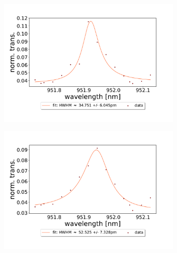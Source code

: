 \begin{figure}[h!]
\begin{subfigure}[b]{0.49\textwidth}
        \includegraphics[width=\textwidth]{figures/results/double fano fits/20250326/53um_M3:M5_fit_5.pdf}
        \caption{}
        \label{fig:53um_M3:M5_fit_5}
    \end{subfigure}
    \begin{subfigure}[b]{0.49\textwidth}
        \includegraphics[width=\textwidth]{figures/results/double fano fits/20250326/53um_M3:M5_fit_6.pdf}
        \caption{}
        \label{fig:53um_M3:M5_fit_6}
    \end{subfigure}
\end{figure}
